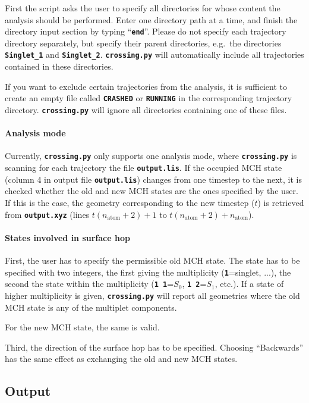 \documentclass[a4paper,11pt,DIV=15,openany,twoside=false]{scrbook}
\newcommand{\ttt}[1]{\textbf{\texttt{#1}}}
\begin{document}
First the script asks the user to specify all directories for whose content the analysis should be performed. Enter one directory path at a time, and finish the directory input section by typing ``\ttt{end}''. Please do not specify each trajectory directory separately, but specify their parent directories, e.g.\ the directories \ttt{Singlet\_1} and \ttt{Singlet\_2}. \ttt{crossing.py} will automatically include all trajectories contained in these directories.

If you want to exclude certain trajectories from the analysis, it is sufficient to create an empty file called \ttt{CRASHED} or \ttt{RUNNING} in the corresponding trajectory directory. \ttt{crossing.py} will ignore all directories containing one of these files.

\paragraph{Analysis mode}

Currently, \ttt{crossing.py} only supports one analysis mode, where \ttt{crossing.py} is scanning for each trajectory the file \ttt{output.lis}. If the occupied MCH state (column 4 in output file \ttt{output.lis}) changes from one timestep to the next, it is checked whether the old and new MCH states are the ones specified by the user. If this is the case, the geometry corresponding to the new timestep ($t$) is retrieved from \ttt{output.xyz} (lines $t(n_{\text{atom}}+2)+1$ to $t(n_{\text{atom}}+2)+n_{\text{atom}}$). 

\paragraph{States involved in surface hop}

First, the user has to specify the permissible old MCH state. The state has to be specified with two integers, the first giving the multiplicity (\ttt{1}=singlet, ...), the second the state within the multiplicity (\ttt{1 1}=$S_0$, \ttt{1 2}=$S_1$, etc.). If a state of higher multiplicity is given, \ttt{crossing.py} will report all geometries where the old MCH state is any of the multiplet components. 

For the new MCH state, the same is valid.

Third, the direction of the surface hop has to be specified. Choosing ``Backwards'' has the same effect as exchanging the old and new MCH states. 

\subsection{Output}
\end{document}
